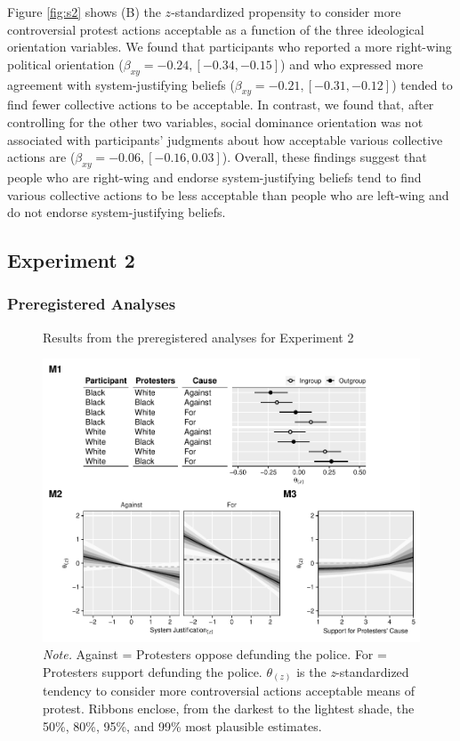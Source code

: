 \documentclass[12pt, letterpaper]{article}
\begin{document}
Figure \ref{fig:s2} shows (B) the \(z\)-standardized propensity to
consider more controversial protest actions acceptable as a function of
the three ideological orientation variables. We found that participants
who reported a more right-wing political orientation
(\(\beta_{xy} = -0.24, [-0.34, -0.15]\)) and who expressed more
agreement with system-justifying beliefs
(\(\beta_{xy} = -0.21, [-0.31, -0.12]\)) tended to find fewer collective
actions to be acceptable. In contrast, we found that, after controlling
for the other two variables, social dominance orientation was not
associated with participants' judgments about how acceptable various
collective actions are (\(\beta_{xy} = -0.06, [-0.16, 0.03]\)). Overall,
these findings suggest that people who are right-wing and endorse
system-justifying beliefs tend to find various collective actions to be
less acceptable than people who are left-wing and do not endorse
system-justifying beliefs.

\hypertarget{experiment-2}{%
\subsection{Experiment 2}\label{experiment-2}}

\hypertarget{preregistered-analyses}{%
\subsubsection{Preregistered Analyses}\label{preregistered-analyses}}

\begin{figure}[!t]
\centering
\caption{Results from the preregistered analyses for Experiment 2}
\includegraphics[scale=1]{../Experiment 2/figures/figure-s3}
\caption*{\textit{Note.} Against = Protesters oppose defunding the police. For = Protesters support defunding the police. $\theta_{(z)}$ is the \textit{z}-standardized tendency to consider more controversial actions acceptable means of protest. Ribbons enclose, from the darkest to the lightest shade, the 50\%, 80\%, 95\%, and 99\% most plausible estimates.}
\label{fig:s3}
\end{figure}
\end{document}

